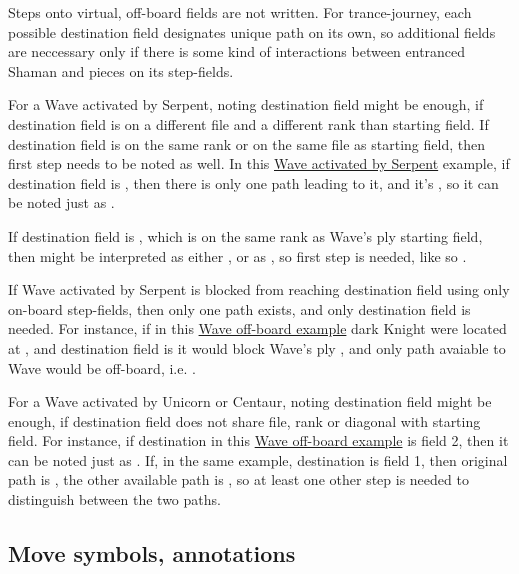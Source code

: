 Steps onto virtual, off-board fields are not written. For trance-journey, each possible destination field designates
unique path on its own, so additional fields are neccessary only if there is some kind of interactions between
entranced Shaman and pieces on its step-fields.

For a Wave activated by Serpent, noting destination field might be enough, if destination field is on a different file
and a different rank than starting field. If destination field is on the same rank or on the same file as starting field,
then first step needs to be noted as well. In this
\hyperref[fig:scn_tr_15_serpent_activated_wave_ply]{Wave activated by Serpent} example, if destination field is ,
then there is only one path leading to it, and it's , so it can be noted just as
.

If destination field is , which is on the same rank as Wave's ply starting field, then  might be
interpreted as either , or as , so first step is needed, like so
.

If Wave activated by Serpent is blocked from reaching destination field using only on-board step-fields, then only one
path exists, and only destination field is needed. For instance, if in this
\hyperref[fig:scn_tr_16_wave_out_of_board]{Wave off-board example} dark Knight were located at , and destination
field is  it would block Wave's ply , and only path avaiable to Wave would be
off-board, i.e. .

For a Wave activated by Unicorn or Centaur, noting destination field might be enough, if destination field does not share
file, rank or diagonal with starting field. For instance, if destination in this
\hyperref[fig:scn_mv_26_wave_off_board]{Wave off-board example} is field 2, then it can be noted just as .
If, in the same example, destination is field 1, then original path is , the other available
path is , so at least one other step is needed to distinguish between the two paths.

\subsection*{Move symbols, annotations}
\label{sec:Appendix/Move symbols, annotations}

